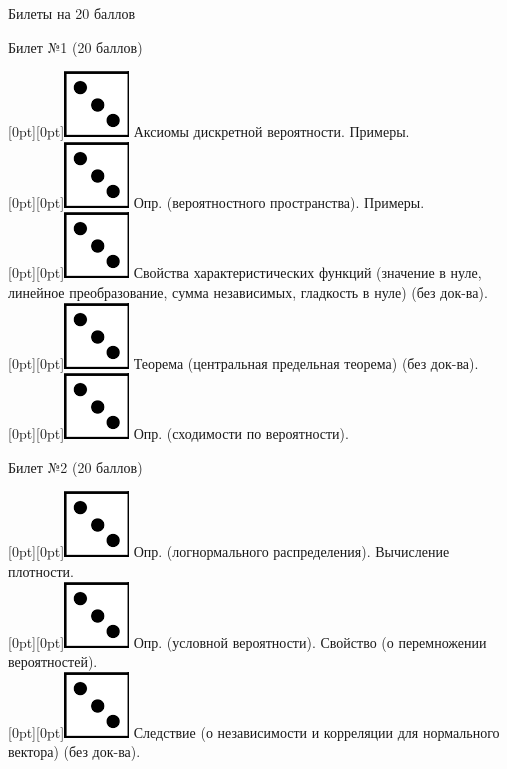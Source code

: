 \documentclass[10pt]{article}
\begin{document}
\thispagestyle{empty}

\begin{center}
    Билеты на 20 баллов
\end{center}
\begin{center} {\Large Билет №1 (20 баллов)} \end{center}
\raisebox{-1pt}[0pt][0pt]{\includegraphics[width=0.02\linewidth]{3.png}} Аксиомы дискретной вероятности. Примеры. \\
\raisebox{-1pt}[0pt][0pt]{\includegraphics[width=0.02\linewidth]{3.png}} Опр. (вероятностного пространства). Примеры. \\
\raisebox{-1pt}[0pt][0pt]{\includegraphics[width=0.02\linewidth]{3.png}} Свойства характеристических функций (значение в нуле, линейное преобразование, сумма независимых, гладкость в нуле) (без док-ва). \\
\raisebox{-1pt}[0pt][0pt]{\includegraphics[width=0.02\linewidth]{3.png}} Теорема (центральная предельная теорема) (без док-ва). \\
\raisebox{-1pt}[0pt][0pt]{\includegraphics[width=0.02\linewidth]{3.png}} Опр. (сходимости по вероятности). \\
\begin{center} {\Large Билет №2 (20 баллов)} \end{center}
\raisebox{-1pt}[0pt][0pt]{\includegraphics[width=0.02\linewidth]{3.png}} Опр. (логнормального распределения). Вычисление плотности. \\
\raisebox{-1pt}[0pt][0pt]{\includegraphics[width=0.02\linewidth]{3.png}} Опр. (условной вероятности).  Свойство (о перемножении вероятностей). \\ 
\raisebox{-1pt}[0pt][0pt]{\includegraphics[width=0.02\linewidth]{3.png}} Следствие (о независимости и корреляции для нормального вектора) (без док-ва). \\ 
\end{document}
